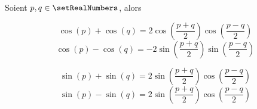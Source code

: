 \begin{theorem}
\label{trigonometrie:simpson}
Soient $p, q \in \setRealNumbers$, alors

\begin{minipage}{0.5\linewidth}
\[
\cos(p) + \cos(q) 
= 2 \cos\left(\dfrac{p+q}{2}\right) \cos\left(\dfrac{p-q}{2}\right)
\]
\[
\cos(p) - \cos(q) 
= -2 \sin\left(\dfrac{p+q}{2}\right) \sin\left(\dfrac{p-q}{2}\right)
\]
\end{minipage}
\begin{minipage}{0.48\linewidth}
\[
\sin(p) + \sin(q) 
= 2 \sin\left(\dfrac{p+q}{2}\right) \cos\left(\dfrac{p-q}{2}\right)
\]
\[
\sin(p) - \sin(q) 
= 2 \sin\left(\dfrac{p+q}{2}\right) \cos\left(\dfrac{p-q}{2}\right)
\]
\end{minipage}
\end{theorem}

